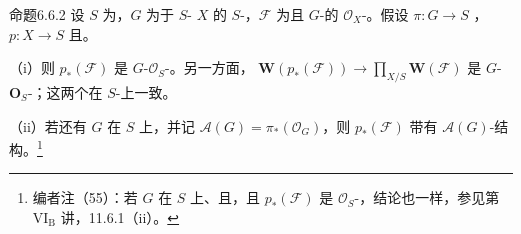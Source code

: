 \begin{SGAresult}{命题}{6.6.2}
设 $S$ 为，$G$ 为于 $S$- $X$ 的 $S$-，$\mathcal F$ 为且 $G$-的 $\mathcal O_X$-。假设 $\pi:G\to S$ ，$p:X\to S$ 且。

（i）则 $p_*(\mathcal F)$ 是 $G$-$\mathcal O_S$-。另一方面， $\mathbf W(p_*(\mathcal F))\to\prod_{X/S}\mathbf W(\mathcal F)$ 是 $G$-$\mathbf O_S$-；这两个在 $S$-上一致。

（ii）若还有 $G$ 在 $S$ 上，并记 $\mathcal A(G)=\pi_*(\mathcal O_G)$，则 $p_*(\mathcal F)$ 带有 $\mathcal A(G)$-结构。\footnote{编者注（55）：若 $G$ 在 $S$ 上、且，且 $p_*(\mathcal F)$ 是 $\mathcal O_S$-，结论也一样，参见第 $\mathrm{VI_B}$ 讲，11.6.1（ii）。}
\end{SGAresult}

